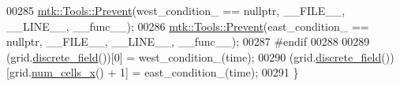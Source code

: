 \begin{DoxyCode}
00285   \hyperlink{classmtk_1_1Tools_a332324c6f25e66be9dff48c5987a3b9f}{mtk::Tools::Prevent}(west\_condition\_ == \textcolor{keyword}{nullptr}, \_\_FILE\_\_, \_\_LINE\_\_, \_\_func\_\_);
00286   \hyperlink{classmtk_1_1Tools_a332324c6f25e66be9dff48c5987a3b9f}{mtk::Tools::Prevent}(east\_condition\_ == \textcolor{keyword}{nullptr}, \_\_FILE\_\_, \_\_LINE\_\_, \_\_func\_\_);
00287 \textcolor{preprocessor}{  #endif}
00288 
00289   (grid.\hyperlink{classmtk_1_1UniStgGrid1D_ab9c3f9ee2ac76a351b01e4abfede4d19}{discrete\_field}())[0] = west\_condition\_(time);
00290   (grid.\hyperlink{classmtk_1_1UniStgGrid1D_ab9c3f9ee2ac76a351b01e4abfede4d19}{discrete\_field}())[grid.\hyperlink{classmtk_1_1UniStgGrid1D_af1b3729d8afa07be5b2775ed68015b80}{num\_cells\_x}() + 1] = east\_condition\_(time);
00291 \}
\end{DoxyCode}
